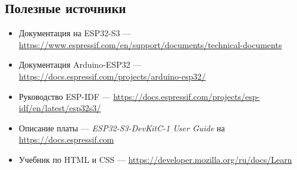 \subsection*{Полезные источники}
\begin{itemize}
  \item Документация на ESP32-S3 --- \url{https://www.espressif.com/en/support/documents/technical-documents}
  \item Документация Arduino-ESP32 --- \url{https://docs.espressif.com/projects/arduino-esp32/}
  \item Руководство ESP-IDF --- \url{https://docs.espressif.com/projects/esp-idf/en/latest/esp32s3/}
  \item Описание платы --- \emph{ESP32-S3-DevKitC-1 User Guide} на \url{https://docs.espressif.com}
  \item Учебник по HTML и CSS --- \url{https://developer.mozilla.org/ru/docs/Learn}
\end{itemize}
